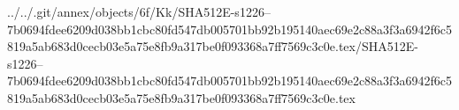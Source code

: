 ../../.git/annex/objects/6f/Kk/SHA512E-s1226--7b0694fdee6209d038bb1cbc80fd547db005701bb92b195140aec69e2c88a3f3a6942f6c5819a5ab683d0cecb03e5a75e8fb9a317be0f093368a7ff7569c3c0e.tex/SHA512E-s1226--7b0694fdee6209d038bb1cbc80fd547db005701bb92b195140aec69e2c88a3f3a6942f6c5819a5ab683d0cecb03e5a75e8fb9a317be0f093368a7ff7569c3c0e.tex